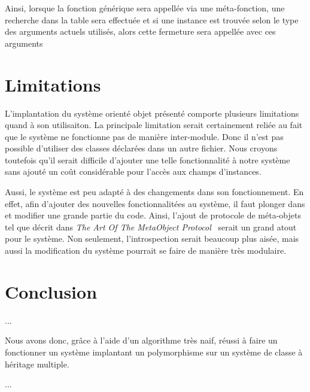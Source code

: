 \documentclass[letterpaper,12pt]{book}
\begin{document}
      Ainsi, lorsque la fonction générique sera appellée via une
      méta-fonction, une recherche dans la table sera effectuée et si
      une instance est trouvée selon le type des arguments actuels
      utilisés, alors cette fermeture sera appellée avec ces arguments
    

\clearpage


 
\section{Limitations}
  L'implantation du système orienté objet présenté comporte plusieurs
  limitations quand à son utilisaiton. La principale limitation serait
  certainement reliée au fait que le système ne fonctionne pas de
  manière inter-module. Donc il n'est pas possible d'utiliser des
  classes déclarées dans un autre fichier. Nous croyons toutefois
  qu'il serait difficile d'ajouter une telle fonctionnalité à notre
  système sans ajouté un coût considérable pour l'accès aux champs
  d'instances.

  Aussi, le système est peu adapté à des changements dans son
  fonctionnement. En effet, afin d'ajouter des nouvelles
  fonctionnalitées au système, il faut plonger dans et modifier une
  grande partie du code. Ainsi, l'ajout de protocole de méta-objets
  tel que décrit dans \textit{The Art Of The MetaObject
    Protocol}~\cite{AOMOP} serait un grand atout pour le système. Non
  seulement, l'introspection serait beaucoup plus aisée, mais aussi la
  modification du système pourrait se faire de manière très modulaire.

  

\clearpage

\section{Conclusion}
  ...

  Nous avons donc, grâce à l'aide d'un algorithme très naif, réussi à
  faire un fonctionner un système implantant un polymorphisme sur un
  système de classe à héritage multiple.

  ...

\clearpage




\end{document}

